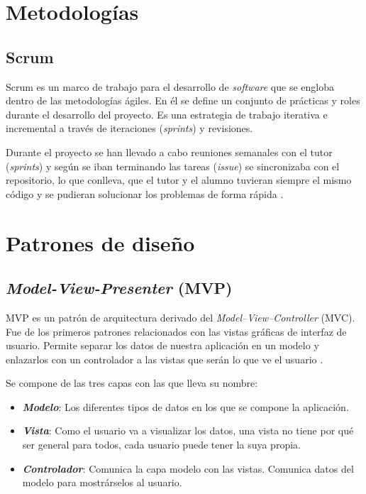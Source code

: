 
\section{Metodologías}\label{metodologias}

\subsection{Scrum}\label{scrum}

Scrum es un marco de trabajo para el desarrollo de \emph{software} que se
engloba dentro de las metodologías ágiles. En él se define un conjunto de prácticas y roles durante el desarrollo del proyecto. Es una estrategia de trabajo iterativa e incremental a través de iteraciones (\emph{sprints})
y revisiones. 

Durante el proyecto se han llevado a cabo reuniones semanales con el tutor (\emph{sprints}) y según se iban terminando las tareas (\emph{issue}) se sincronizaba con el repositorio, lo que conlleva, que el tutor y el alumno tuvieran siempre el mismo código y se pudieran solucionar los problemas de forma rápida \cite{Schwaber2004}.

\section{Patrones de diseño}\label{patrones-de-diseno}

\subsection{\emph{Model-View-Presenter} (MVP)}\label{model-view-presenter-mvp}

MVP es un patrón de arquitectura derivado del
\emph{Model--View--Controller} (MVC). Fue de los primeros patrones relacionados con las vistas gráficas de interfaz de usuario. Permite separar los datos de nuestra aplicación en un modelo y enlazarlos con un controlador a las vistas que serán lo que ve el usuario \cite{art:mvc}.

Se compone de las tres capas con las que lleva su nombre:

\begin{itemize}
	\tightlist
	\item
	\textit{\textbf{Modelo}}: Los diferentes tipos de datos en los que se compone la aplicación.
	\item
	\textit{\textbf{Vista}}: Como el usuario va a visualizar los datos, una vista no tiene por qué ser general para todos, cada usuario puede tener la suya propia.
	\item
	\textit{\textbf{Controlador}}: Comunica la capa modelo con las vistas. Comunica datos del modelo para mostrárselos al usuario.
\end{itemize}

